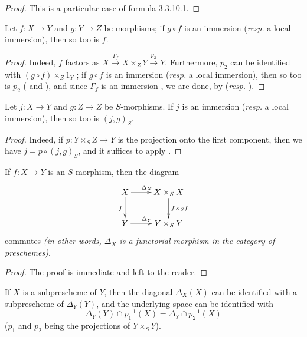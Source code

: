 \begin{proof}
\label{proof-1.5.3.12}
This is a particular case of formula \hyperref[1.3.3.10]{3.3.10.1}.
\end{proof}

\begin{cor}[5.3.13]
\label{1.5.3.13}
Let $f:X\to Y$ and $g:Y\to Z$ be morphisms;
if $g\circ f$ is an immersion (\emph{resp.} a local immersion), then so too is $f$.
\end{cor}

\begin{proof}
\label{proof-1.5.3.13}
Indeed, $f$ factors as $X\xrightarrow{\Gamma_f}X\times_Z Y\xrightarrow{p_2}Y$.
Furthermore, $p_2$ can be identified with $(g\circ f)\times_Z 1_Y$ ;
if $g\circ f$ is an immersion (\emph{resp.} a local immersion), then so too is $p_2$ ( and ), and since $\Gamma_f$ is an immersion , we are done, by  (\emph{resp.} ).
\end{proof}

\begin{cor}[5.3.14]
\label{1.5.3.14}
Let $j:X\to Y$ and $g:Z\to Z$ be $S$-morphisms.
If $j$ is an immersion (\emph{resp.} a local immersion), then so too is $(j,g)_S$.
\end{cor}

\begin{proof}
\label{proof-1.5.3.14}
Indeed, if $p:Y\times_S Z\to Y$ is the projection onto the first component, then we have $j=p\circ(j,g)_S$, and it suffices to apply .
\end{proof}

\begin{prop}[5.3.15]
\label{1.5.3.15}
If $f:X\to Y$ is an $S$-morphism, then the diagram
\[
  \xymatrix{
    X\ar[r]^{\Delta_X}\ar[d]_f &
    X\times_S X\ar[d]^{f\times_S f}\\
    Y\ar[r]^{\Delta_Y} &
    Y\times_S Y
  }
\]
commutes \emph{(in other words, $\Delta_X$ is a functorial morphism in the category of preschemes)}.
\end{prop}

\begin{proof}
\label{proof-1.5.3.15}
The proof is immediate and left to the reader.
\end{proof}

\begin{cor}[5.3.16]
\label{1.5.3.16}
If $X$ is a subprescheme of $Y$, then the diagonal $\Delta_X(X)$ can be identified with a subprescheme of $\Delta_Y(Y)$, and the underlying space can be identified with
\[
  \Delta_Y(Y)\cap p_1^{-1}(X)=\Delta_Y\cap p_2^{-1}(X)
\]
($p_1$ and $p_2$ being the projections of $Y\times_S Y$).
\end{cor}

